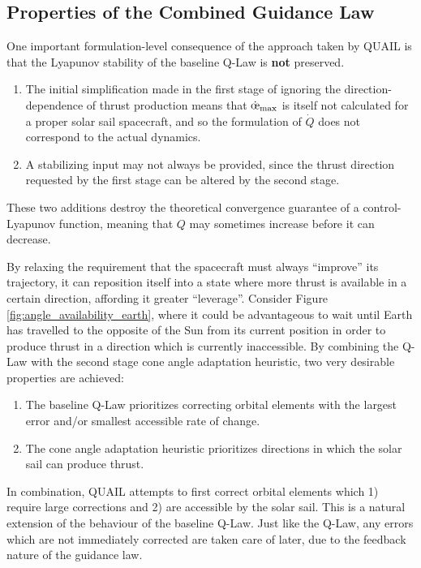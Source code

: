 \subsection{Properties of the Combined Guidance Law}
One important formulation-level consequence of the approach taken by QUAIL is that the Lyapunov stability of the baseline Q-Law is \textbf{not} preserved.
\begin{enumerate}
    \item The initial simplification made in the first stage of ignoring the direction-dependence of thrust production means that \(\dot{\moe}_{\text{max}}\) is itself not calculated for a proper solar sail spacecraft, and so the formulation of \(\dot{Q}\) does not correspond to the actual dynamics.
    \item A stabilizing input may not always be provided, since the thrust direction requested by the first stage can be altered by the second stage.
\end{enumerate}
These two additions destroy the theoretical convergence guarantee of a control-Lyapunov function, meaning that \(Q\) may sometimes increase before it can decrease.

By relaxing the requirement that the spacecraft must always ``improve'' its trajectory, it can reposition itself into a state where more thrust is available in a certain direction, affording it greater ``leverage''. Consider Figure \ref{fig:angle_availability_earth}, where it could be advantageous to wait until Earth has travelled to the opposite of the Sun from its current position in order to produce thrust in a direction which is currently inaccessible. By combining the Q-Law with the second stage cone angle adaptation heuristic, two very desirable properties are achieved:
\begin{enumerate}
    \item The baseline Q-Law prioritizes correcting orbital elements with the largest error and/or smallest accessible rate of change.
    \item The cone angle adaptation heuristic prioritizes directions in which the solar sail can produce thrust.
\end{enumerate}
In combination, QUAIL attempts to first correct orbital elements which 1) require large corrections and 2) are accessible by the solar sail. This is a natural extension of the behaviour of the baseline Q-Law. Just like the Q-Law, any errors which are not immediately corrected are taken care of later, due to the feedback nature of the guidance law.

